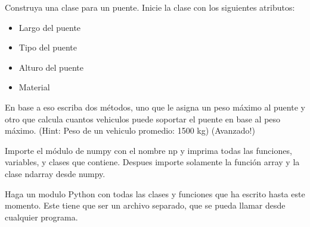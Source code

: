 \documentclass[11pt]{exam}
\begin{document}
\begin{questions}
\item Construya una clase para un puente. Inicie la clase con los siguientes atributos:
        \begin{itemize}
            \item Largo del puente
            \item Tipo del puente
            \item Alturo del puente
            \item Material
        \end{itemize}
     En base a eso escriba dos métodos, uno que le asigna un peso máximo al puente y otro
     que calcula cuantos vehiculos puede soportar el puente en base al peso máximo. (Hint: Peso 
     de un vehiculo promedio: 1500 kg) (Avanzado!)

\item Importe el módulo de numpy con el nombre np y imprima todas las funciones, variables,
      y clases que contiene. Despues importe solamente la función array y la clase ndarray desde
      numpy.

\item Haga un modulo Python con todas las clases y funciones que ha escrito hasta este momento.
      Este tiene que ser un archivo separado, que se pueda llamar desde cualquier programa.
\end{questions}
\end{document}

